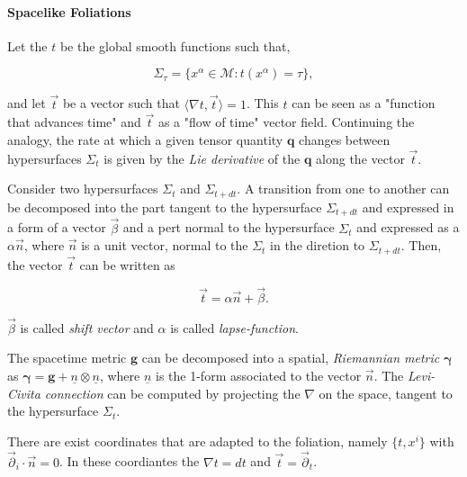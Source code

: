 {    
    \paragraph{Spacelike Foliations}
    
    
    Let the $t$ be the global smooth functions such that, 
    
    \begin{equation}
    \Sigma_{\tau} = \{x^{\alpha}\in\mathcal{M}: t(x^{\alpha})=\tau\},
    \end{equation}
    
    and let $\vec{t}$ be a vector such that $\langle\nabla t, \vec{t}\rangle = 1$. 
    This $t$ can be seen as a "function that advances time" and $\vec{t}$ as a "flow of time" vector field.
    Continuing the analogy, the rate at which a given tensor quantity $\boldsymbol{q}$ changes between hypersurfaces $\Sigma_t$ is given by the \textit{Lie derivative} of the $\boldsymbol{q}$ along the vector $\vec{t}$.
    
    Consider two hypersurfaces $\Sigma_t$ and $\Sigma_{t+dt}$. 
    A transition from one to another can be decomposed into the part tangent to the hypersurface $\Sigma_{t+dt}$ and expressed in a form of a vector $\vec{\beta}$ and a pert normal to the hypersurface $\Sigma_t$ and expressed as a $\alpha \vec{n}$, where $\vec{n}$ is a unit vector, normal to the $\Sigma_t$ in the diretion to $\Sigma_{t+dt}$. 
    Then, the vector $\vec{t}$ can be written as 
    
    \begin{equation}
    \vec{t} = \alpha\vec{n}+\vec{\beta}.
    \end{equation}
    
    $\vec{\beta}$ is called \textit{shift vector} and $\alpha$ is called \textit{lapse-function}. 
    
    The spacetime metric $\boldsymbol{g}$ can be decomposed into a spatial, \textit{Riemannian metric} $\boldsymbol{\gamma}$ as $\boldsymbol{\gamma} = \boldsymbol{g} + \underline{n} \otimes \underline{n}$, where $\underline{n}$ is the 1-form associated to the vector $\vec{n}$. 
    The \textit{Levi-Civita connection} can be computed by projecting the $\nabla$ on the space, tangent to the hypersurface $\Sigma_t$.
    
    There are exist coordinates that are adapted to the foliation, namely $\{t, x^i\}$ with $\vec{\partial}_i\cdot \vec{n} = 0$. 
    In these coordiantes the $\nabla t = dt$ and $\vec{t} = \vec{\partial}_t$. 
    
}
